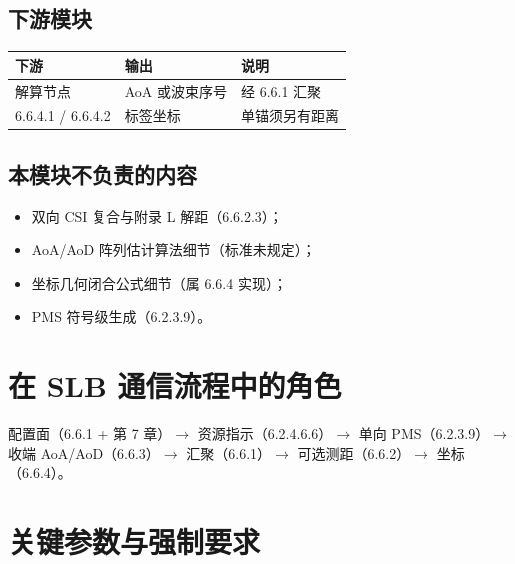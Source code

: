 \documentclass[11pt,a4paper]{ctexart}
\begin{document}
\subsection{下游模块}

\begin{table}[h]
\centering
\small
\begin{tabular}{L{3.2cm}L{4.2cm}L{5.5cm}}
\toprule
\textbf{下游} & \textbf{输出} & \textbf{说明} \\
\midrule
解算节点 & AoA 或波束序号 & 经 6.6.1 汇聚 \\
6.6.4.1 / 6.6.4.2 & 标签坐标 & 单锚须另有距离 \\
\bottomrule
\end{tabular}
\end{table}

\subsection{本模块不负责的内容}

\begin{itemize}[nosep]
  \item 双向 CSI 复合与附录 L 解距（6.6.2.3）；
  \item AoA/AoD 阵列估计算法细节（标准未规定）；
  \item 坐标几何闭合公式细节（属 6.6.4 实现）；
  \item PMS 符号级生成（6.2.3.9）。
\end{itemize}

\section{在 SLB 通信流程中的角色}

配置面（6.6.1 + 第 7 章）$\rightarrow$ 资源指示（6.2.4.6.6）$\rightarrow$ 单向 PMS（6.2.3.9）$\rightarrow$ 收端 AoA/AoD（6.6.3）$\rightarrow$ 汇聚（6.6.1）$\rightarrow$ 可选测距（6.6.2）$\rightarrow$ 坐标（6.6.4）。

\section{关键参数与强制要求}
\end{document}
